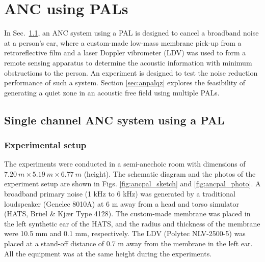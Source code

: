 \chapter{ANC using PALs} %
\label{chap:anc} %


\noindent
In Sec.~\ref{sec:ancpal}, an ANC system using a PAL is designed to cancel a broadband noise at a person's ear, where a custom-made low-mass membrane pick-up from a retroreflective film and a laser Doppler vibrometer (LDV) was used to form a remote sensing apparatus to determine the acoustic information with minimum obstructions to the person. 
An experiment is designed to test the noise reduction performance of such a system.
Section \ref{sec:anpalqz} explores the feasibility of generating a quiet zone in an acoustic free field using multiple PALs.

\section{Single channel ANC system using a PAL}
\label{sec:ancpal}

\subsection{Experimental setup}
The experiments were conducted in a semi-anechoic room with dimensions of $\SI{7.20}{m} \times \SI{5.19}{ m} \times\SI{6.77}{m}$ (height).
The schematic diagram and the photos of the experiment setup are shown in Figs. \ref{fig:ancpal_sketch} and \ref{fig:ancpal_photo}. 
A broadband primary noise (1 kHz to 6 kHz) was generated by a traditional loudspeaker (Genelec 8010A) at 6 m away from a head and torso simulator (HATS, Brüel \& Kjær Type 4128). 
The custom-made membrane was placed in the left synthetic ear of the HATS, and the radius and thickness of the membrane were 10.5 mm and 0.1 mm, respectively. 
The LDV (Polytec NLV-2500-5) was placed at a stand-off distance of 0.7 m away from the membrane in the left ear. 
All the equipment was at the same height during the experiments. 

